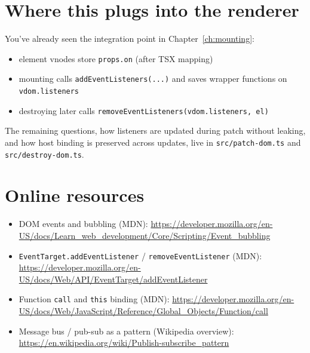 \section{Where this plugs into the renderer}
You've already seen the integration point in Chapter~\ref{ch:mounting}:

\begin{itemize}
  \item element vnodes store \texttt{props.on} (after TSX mapping)
  \item mounting calls \texttt{addEventListeners(...)} and saves wrapper functions on \texttt{vdom.listeners}
  \item destroying later calls \texttt{removeEventListeners(vdom.listeners, el)}
\end{itemize}

The remaining questions, how listeners are updated during patch without leaking, and how host binding is preserved across updates, live in \texttt{src/patch-dom.ts} and \texttt{src/destroy-dom.ts}.

\section{Online resources}
\begin{itemize}
  \item DOM events and bubbling (MDN): \href{https://developer.mozilla.org/en-US/docs/Learn_web_development/Core/Scripting/Event_bubbling}{\url{https://developer.mozilla.org/en-US/docs/Learn_web_development/Core/Scripting/Event_bubbling}}
  \item \texttt{EventTarget.addEventListener} / \texttt{removeEventListener} (MDN): \href{https://developer.mozilla.org/en-US/docs/Web/API/EventTarget/addEventListener}{\url{https://developer.mozilla.org/en-US/docs/Web/API/EventTarget/addEventListener}}
  \item Function \texttt{call} and \texttt{this} binding (MDN): \href{https://developer.mozilla.org/en-US/docs/Web/JavaScript/Reference/Global_Objects/Function/call}{\url{https://developer.mozilla.org/en-US/docs/Web/JavaScript/Reference/Global_Objects/Function/call}}
  \item Message bus / pub-sub as a pattern (Wikipedia overview): \href{https://en.wikipedia.org/wiki/Publish%E2%80%93subscribe_pattern}{\url{https://en.wikipedia.org/wiki/Publish-subscribe_pattern}}
\end{itemize}
